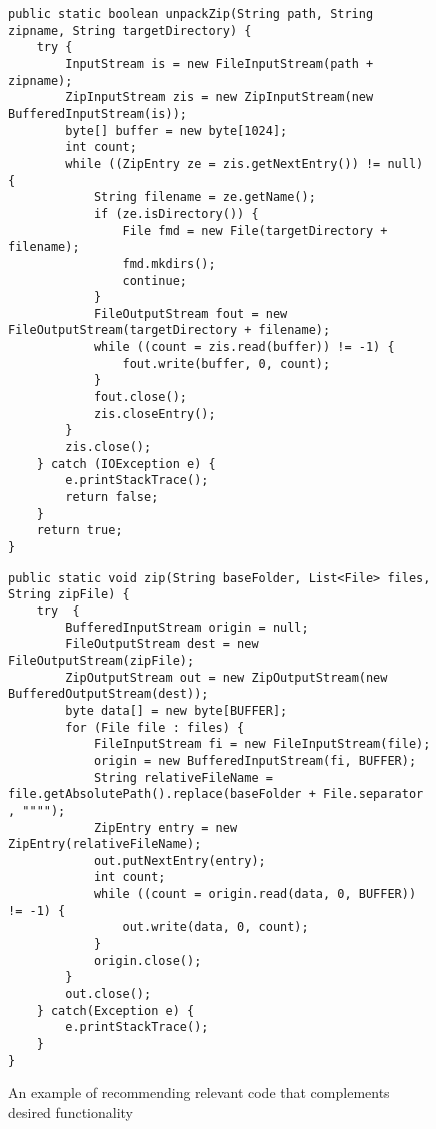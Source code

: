 \begin{figure*}[!t]
\begin{minipage}[t]{0.5\linewidth}
\begin{lstlisting}[style=MyJavaSmallStyle, caption={Query code: unpacking a zip file}, label={lst:mot-query}]
public static boolean unpackZip(String path, String zipname, String targetDirectory) {
	try {
		InputStream is = new FileInputStream(path + zipname);
		ZipInputStream zis = new ZipInputStream(new BufferedInputStream(is));
		byte[] buffer = new byte[1024];
		int count;
		while ((ZipEntry ze = zis.getNextEntry()) != null) {
			String filename = ze.getName();
			if (ze.isDirectory()) {
				File fmd = new File(targetDirectory + filename);
				fmd.mkdirs();
				continue;
			}
			FileOutputStream fout = new FileOutputStream(targetDirectory + filename);
			while ((count = zis.read(buffer)) != -1) {
				fout.write(buffer, 0, count);
			}
			fout.close();
			zis.closeEntry();
		}
		zis.close();
	} catch (IOException e) {
		e.printStackTrace();
		return false;
	}
	return true;
}
\end{lstlisting}
\end{minipage}
%
\begin{minipage}[t]{0.5\linewidth}
\begin{lstlisting}[style=MyJavaSmallStyle, caption={Related code: zipping a file}, label={lst:mot-related}]
public static void zip(String baseFolder, List<File> files, String zipFile) {
	try  {
		BufferedInputStream origin = null;
		FileOutputStream dest = new FileOutputStream(zipFile);
		ZipOutputStream out = new ZipOutputStream(new BufferedOutputStream(dest));
		byte data[] = new byte[BUFFER];
		for (File file : files) {
			FileInputStream fi = new FileInputStream(file);
			origin = new BufferedInputStream(fi, BUFFER);
			String relativeFileName = file.getAbsolutePath().replace(baseFolder + File.separator , """");
			ZipEntry entry = new ZipEntry(relativeFileName);
			out.putNextEntry(entry);
			int count;
			while ((count = origin.read(data, 0, BUFFER)) != -1) {
				out.write(data, 0, count);
			}
			origin.close();
		}
		out.close();
	} catch(Exception e) {
		e.printStackTrace();
	}
}
\end{lstlisting}
\end{minipage}
\caption{An example of recommending relevant code that complements desired functionality}
\label{fig:example}
\end{figure*}